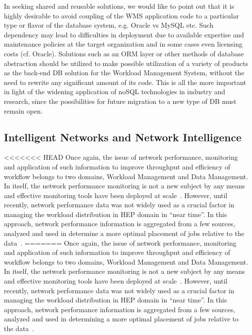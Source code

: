 In seeking shared and reusable solutions, we would like to point out that it is highly desirable to avoid coupling of the WMS application code to a particular
type or flavor of the database system, e.g. Oracle vs MySQL etc. Such dependency may lead to difficulties in deployment due to available
expertise and maintenance policies at the target organization and in some cases even licensing costs (cf. Oracle). Solutions such as an ORM layer
or other methods of database abstraction
should be utilized to make possible utilization of a variety of  products as the back-end DB solution for the Workload Management System,
without the need to rewrite any significant amount of its code. This is all the more important in light of the widening application of noSQL
technologies in industry and research, since the possibilities for future migration to a new type of DB must remain open.


\subsection{Intelligent Networks and Network Intelligence}

<<<<<<< HEAD
Once again, the issue of network performance, monitoring and application of such information to improve
throughput and efficiency of workflow belongs to two domains, Workload Management and Data Management. In itself, the network performance monitoring is not a new subject by any means and effective monitoring tools have been deployed at scale~\cite{perfsonar_chep12}. However, until recently, network performance data was not
widely used as a crucial factor in managing the workload distribution in HEP domain in ``near time''. In this approach, network performance information is aggregated from a few sources, analyzed and used in determine a more optimal placement of jobs relative to the data~\cite{panda_chep13}.
=======
Once again, the issue of network performance, monitoring and application of such information to improve throughput and efficiency of workflow
belongs to two domains, Workload Management and Data Management. In itself, the network performance monitoring is not a new subject by any means
and effective monitoring tools have been deployed at scale~\cite{perfsonar_chep12}. However, until recently, network performance data was not
widely used as a crucial factor in managing the workload distribution in HEP domain in ``near time''. In this approach, network performance information
is aggregated from a few sources, analyzed and used in determining a more optimal placement of jobs relative to the data~\cite{panda_chep13}.

